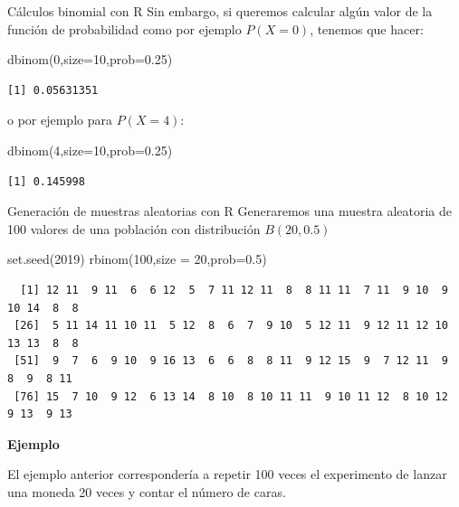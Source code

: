\documentclass[
  ignorenonframetext,
  aspectratio=169]{beamer}
\newenvironment{Shaded}{\begin{snugshade}}{\end{snugshade}}
\newcommand{\AttributeTok}[1]{\textcolor[rgb]{0.40,0.45,0.13}{#1}}
\newcommand{\DecValTok}[1]{\textcolor[rgb]{0.68,0.00,0.00}{#1}}
\newcommand{\FloatTok}[1]{\textcolor[rgb]{0.68,0.00,0.00}{#1}}
\newcommand{\FunctionTok}[1]{\textcolor[rgb]{0.28,0.35,0.67}{#1}}
\newcommand{\NormalTok}[1]{\textcolor[rgb]{0.00,0.23,0.31}{#1}}
\begin{document}
\begin{frame}[fragile]{Cálculos binomial con R}
\protect\hypertarget{cuxe1lculos-binomial-con-r-1}{}
Sin embargo, si queremos calcular algún valor de la función de
probabilidad como por ejemplo \(P(X=0)\), tenemos que hacer:

\begin{Shaded}
\begin{Highlighting}[]
\FunctionTok{dbinom}\NormalTok{(}\DecValTok{0}\NormalTok{,}\AttributeTok{size=}\DecValTok{10}\NormalTok{,}\AttributeTok{prob=}\FloatTok{0.25}\NormalTok{)}
\end{Highlighting}
\end{Shaded}

\begin{verbatim}
[1] 0.05631351
\end{verbatim}

o por ejemplo para \(P(X=4)\):

\begin{Shaded}
\begin{Highlighting}[]
\FunctionTok{dbinom}\NormalTok{(}\DecValTok{4}\NormalTok{,}\AttributeTok{size=}\DecValTok{10}\NormalTok{,}\AttributeTok{prob=}\FloatTok{0.25}\NormalTok{)}
\end{Highlighting}
\end{Shaded}

\begin{verbatim}
[1] 0.145998
\end{verbatim}
\end{frame}

\begin{frame}[fragile]{Generación de muestras aleatorias con R}
\protect\hypertarget{generaciuxf3n-de-muestras-aleatorias-con-r}{}
Generaremos una muestra aleatoria de 100 valores de una población con
distribución \(B(20,0.5)\)

\begin{Shaded}
\begin{Highlighting}[]
\FunctionTok{set.seed}\NormalTok{(}\DecValTok{2019}\NormalTok{)}
\FunctionTok{rbinom}\NormalTok{(}\DecValTok{100}\NormalTok{,}\AttributeTok{size =} \DecValTok{20}\NormalTok{,}\AttributeTok{prob=}\FloatTok{0.5}\NormalTok{)}
\end{Highlighting}
\end{Shaded}

\begin{verbatim}
  [1] 12 11  9 11  6  6 12  5  7 11 12 11  8  8 11 11  7 11  9 10  9 10 14  8  8
 [26]  5 11 14 11 10 11  5 12  8  6  7  9 10  5 12 11  9 12 11 12 10 13 13  8  8
 [51]  9  7  6  9 10  9 16 13  6  6  8  8 11  9 12 15  9  7 12 11  9  8  9  8 11
 [76] 15  7 10  9 12  6 13 14  8 10  8 10 11 11  9 10 11 12  8 10 12  9 13  9 13
\end{verbatim}

\textbf{Ejemplo}

El ejemplo anterior correspondería a repetir 100 veces el experimento de
lanzar una moneda 20 veces y contar el número de caras.
\end{frame}
\end{document}

